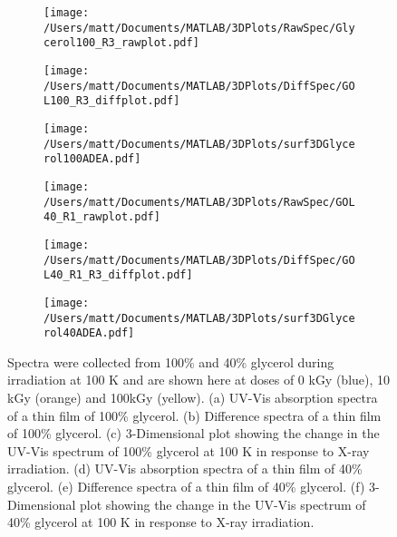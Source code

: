 \begin{figure}[!htb]
\centering
\begin{subfigure}{.33\textwidth}
  \centering
  \texttt{[image: /Users/matt/Documents/MATLAB/3DPlots/RawSpec/Glycerol100\_R3\_rawplot.pdf]}
  \caption{}
  \label{fig:glycerol_series}
\end{subfigure}%
\begin{subfigure}{.33\textwidth}
  \centering
  \texttt{[image: /Users/matt/Documents/MATLAB/3DPlots/DiffSpec/GOL100\_R3\_diffplot.pdf]}
  \caption{}
  \label{fig:glycerol_diff}
\end{subfigure}
\begin{subfigure}{.33\textwidth}
  \centering
  \texttt{[image: /Users/matt/Documents/MATLAB/3DPlots/surf3DGlycerol100ADEA.pdf]}
  \caption{}
  \label{fig:glycerol_3Dplot}
\end{subfigure}
\begin{subfigure}{.33\textwidth}
  \centering
  \texttt{[image: /Users/matt/Documents/MATLAB/3DPlots/RawSpec/GOL40\_R1\_rawplot.pdf]}
  \caption{}
  \label{fig:GOL40_norm}
\end{subfigure}%
\begin{subfigure}{.33\textwidth}
  \centering
  \texttt{[image: /Users/matt/Documents/MATLAB/3DPlots/DiffSpec/GOL40\_R1\_R3\_diffplot.pdf]}
  \caption{}
  \label{fig:GOL40_diff}
\end{subfigure}
\begin{subfigure}{.33\textwidth}
  \centering
  \texttt{[image: /Users/matt/Documents/MATLAB/3DPlots/surf3DGlycerol40ADEA.pdf]}
  \caption{}
  \label{fig:GOL40_heat}
\end{subfigure}
\caption[UV-Vis Spectra of X-ray Irradiated Glycerol at 100 K]{Spectra were collected from 100\% and 40\% glycerol during irradiation at 100 K and are shown here at doses of 0 kGy (blue), 10 kGy (orange) and 100kGy (yellow). (a) UV-Vis absorption spectra of a thin film of 100\% glycerol. (b) Difference spectra of a thin film of 100\% glycerol. (c) 3-Dimensional plot showing the change in the UV-Vis spectrum of 100\% glycerol at 100 K in response to X-ray irradiation. (d) UV-Vis absorption spectra of a thin film of 40\% glycerol. (e) Difference spectra of a thin film of 40\% glycerol. (f) 3-Dimensional plot showing the change in the UV-Vis spectrum of 40\% glycerol at 100 K in response to X-ray irradiation.}
\end{figure}

